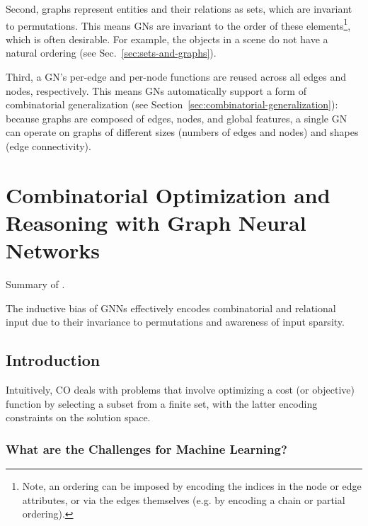 \documentclass[10pt]{book}
\begin{document}
Second, graphs represent entities and their relations as sets, which are invariant to permutations. This means GNs are invariant to the order of these elements\footnote{Note, an ordering can be imposed by encoding the indices in the node or edge attributes, or via the edges themselves (e.g. by encoding a chain or partial ordering).}, which is often desirable.
For example, the objects in a scene do not have a natural ordering (see Sec.~\ref{sec:sets-and-graphs}).

Third, a GN's per-edge and per-node functions are reused across all edges and nodes, respectively. This means GNs automatically support a form of combinatorial generalization (see Section~\ref{sec:combinatorial-generalization}): because graphs are composed of edges, nodes, and global features, a single GN can operate on graphs of different sizes (numbers of edges and nodes) and shapes (edge connectivity).




\chapter{Combinatorial Optimization and Reasoning with Graph Neural Networks}

Summary of \cite{cappart2021combinatorial}.

The inductive bias of GNNs effectively encodes combinatorial and relational input due to their invariance to permutations and awareness of input sparsity.

\section{Introduction}

Intuitively, CO deals with problems that involve optimizing a cost (or objective) function by selecting a subset from a finite set, with the latter encoding constraints on the solution space.

\subsection{What are the Challenges for Machine Learning?}
\end{document}
